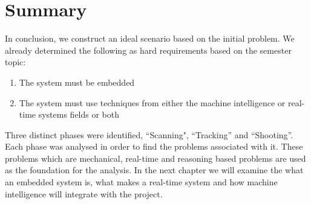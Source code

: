 \section{Summary}
In conclusion, we construct an ideal scenario based on the initial problem. We
already determined the following as hard requirements based on the semester
topic:

\begin{enumerate}
	\item The system must be embedded
	\item The system must use techniques from either the machine intelligence or
	real-time systems fields or both
\end{enumerate}

Three distinct phases were identified, ``Scanning", ``Tracking'' and
``Shooting''. Each phase was analysed in order to find the problems associated
with it. These problems which are mechanical, real-time and reasoning based
problems are used as the foundation for the analysis. In the next chapter
we will examine the what an embedded system is, what makes a real-time system
and how machine intelligence will integrate with the project.